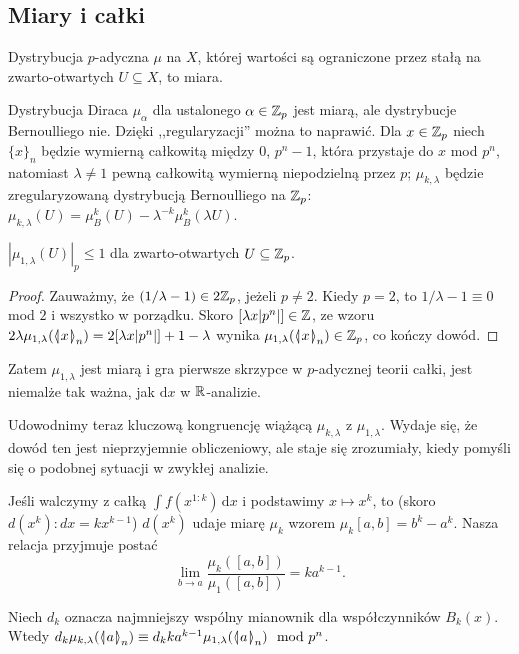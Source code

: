 \subsection{Miary i całki}
\begin{definicja}
	Dystrybucja  $p$-adyczna $\mu$ na $X$, której wartości są ograniczone przez stałą na zwarto-otwartych $U\subseteq X$, to miara.
\end{definicja}

Dystrybucja Diraca $\mu_\alpha$ dla ustalonego $\alpha \in \mathbb Z_p$ jest miarą, ale dystrybucje Bernoulliego nie.
Dzięki ,,regularyzacji'' można to naprawić.
Dla $x \in \mathbb Z_p$ niech $\{x\}_n$ będzie wymierną całkowitą między $0$, $p^n-1$, która przystaje do $x$ mod $p^n$, natomiast $\lambda \neq 1$ pewną całkowitą wymierną niepodzielną przez $p$; $\mu_{k, \lambda}$ będzie zregularyzowaną dystrybucją Bernoulliego na $\mathbb Z_p$: $\mu_{k,\lambda}(U) = \mu_B^k(U) - \lambda^{-k} \mu_B^k (\lambda U)$.

\begin{fakt}
	$|\mu_{1, \lambda} (U)|_p \le 1$ dla zwarto-otwartych $U \subseteq \mathbb Z_p$.
\end{fakt}

\begin{proof}
	Zauważmy, że $(1/\lambda - 1) \in 2\mathbb Z_p$, jeżeli $p \neq 2$.
	Kiedy $p = 2$, to $1/\lambda - 1 \equiv 0$ mod $2$ i wszystko w porządku.
	Skoro $[\lambda x |p^n|] \in \mathbb Z$, ze wzoru $2\lambda \mu_{1, \lambda}(\mathrel{\langle\mkern-3.85mu\mid\mkern-4mu} {x}\mathrel{\mkern-4mu\mid\mkern-3.85mu\rangle}_{n}) = 2[\lambda x |p^n|] + 1-\lambda$ wynika $\mu_{1, \lambda}(\mathrel{\langle\mkern-3.85mu\mid\mkern-4mu} {x}\mathrel{\mkern-4mu\mid\mkern-3.85mu\rangle}_{n}) \in \mathbb Z_p$, co kończy dowód.
\end{proof}

Zatem $\mu_{1,\lambda}$ jest miarą i gra pierwsze skrzypce w $p$-adycznej teorii całki, jest niemalże tak ważna, jak $\mathrm{d}x$ w $\mathbb R$-analizie.

Udowodnimy teraz kluczową kongruencję wiążącą $\mu_{k,\lambda}$ z $\mu_{1, \lambda}$.
Wydaje się, że dowód ten jest nieprzyjemnie obliczeniowy, ale staje się zrozumiały, kiedy pomyśli się o podobnej sytuacji w zwykłej analizie.

Jeśli walczymy z całką $\int f(x^{1:k}) \,\textrm{d}x$ i podstawimy $x \mapsto x^k$, to (skoro $d(x^k):dx = kx^{k-1}$) $d(x^k)$ udaje miarę $\mu_k$ wzorem $\mu_k[a,b] = b^k - a^k$.
Nasza relacja przyjmuje postać
\[
	\lim_{b \to a} \frac{\mu_k([a,b])}{\mu_1([a,b])} = ka^{k-1}.
\]

\begin{fakt}\label{heroine}
	Niech $d_k$ oznacza najmniejszy wspólny mianownik dla współczynników $B_k(x)$.
	Wtedy $d_k \mu_{k, \lambda}(\mathrel{\langle\mkern-3.85mu\mid\mkern-4mu} {a}\mathrel{\mkern-4mu\mid\mkern-3.85mu\rangle}_{n}) \equiv d_k ka^{k-1} \mu_{1, \lambda}(\mathrel{\langle\mkern-3.85mu\mid\mkern-4mu} {a}\mathrel{\mkern-4mu\mid\mkern-3.85mu\rangle}_{n}) \mod {p^n}$.
\end{fakt}

